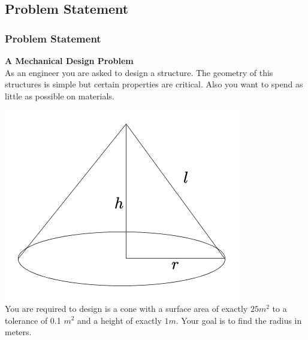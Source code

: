 \documentclass[fleqn]{beamer} %
\newcommand{\sectionIVsubsectionItitle}{Problem Statement}
\begin{document}
		\subsection{\sectionIVsubsectionItitle}\label{sectionIVsubsectionI}

			\begin{frame}
				\frametitle{\sectionIVsubsectionItitle}
				\bigskip

				\textbf{A Mechanical Design Problem}\\	
		
				As an engineer you are asked to design a structure. The geometry of this structures is simple but certain properties are critical. Also you want to spend as little as possible on materials.
					
				\includegraphics[scale=.35]{images/lecture3_fig1.png}\\
					
				You are required to design is a cone with a surface area of exactly $25 m^2$ to a tolerance of 0.1 $m^2$ and a height of exactly $1 m$. Your goal is to find the radius in meters.\\
						
				\btVFill
			\end{frame}
\end{document}
